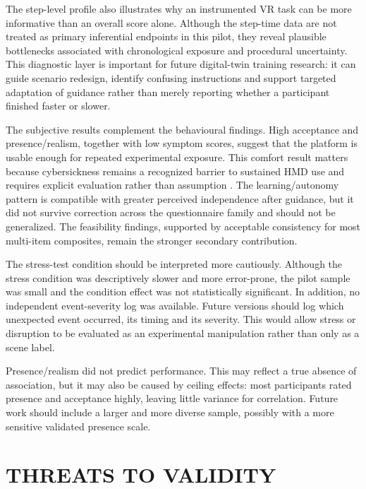 \documentclass[a4paper,twoside]{article}
\begin{document}
The step-level profile also illustrates why an instrumented VR task can be more informative than an overall score alone. Although the step-time data are not treated as primary inferential endpoints in this pilot, they reveal plausible bottlenecks associated with chronological exposure and procedural uncertainty. This diagnostic layer is important for future digital-twin training research: it can guide scenario redesign, identify confusing instructions and support targeted adaptation of guidance rather than merely reporting whether a participant finished faster or slower.

The subjective results complement the behavioural findings. High acceptance and presence/realism, together with low symptom scores, suggest that the platform is usable enough for repeated experimental exposure. This comfort result matters because cybersickness remains a recognized barrier to sustained HMD use and requires explicit evaluation rather than assumption \cite{Ang2023}. The learning/autonomy pattern is compatible with greater perceived independence after guidance, but it did not survive correction across the questionnaire family and should not be generalized. The feasibility findings, supported by acceptable consistency for most multi-item composites, remain the stronger secondary contribution.

The stress-test condition should be interpreted more cautiously. Although the stress condition was descriptively slower and more error-prone, the pilot sample was small and the condition effect was not statistically significant. In addition, no independent event-severity log was available. Future versions should log which unexpected event occurred, its timing and its severity. This would allow stress or disruption to be evaluated as an experimental manipulation rather than only as a scene label.

Presence/realism did not predict performance. This may reflect a true absence of association, but it may also be caused by ceiling effects: most participants rated presence and acceptance highly, leaving little variance for correlation. Future work should include a larger and more diverse sample, possibly with a more sensitive validated presence scale.

\section{\uppercase{Threats to Validity}}
\label{sec:validity}
\end{document}
